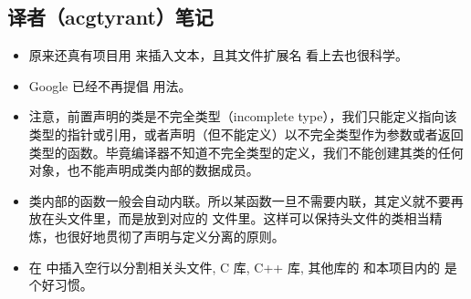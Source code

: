 \subsection{译者（acgtyrant）笔记}

\begin{itemize}
	\item  原来还真有项目用  来插入文本，且其文件扩展名  看上去也很科学。
	\item  Google 已经不再提倡  用法。
	\item  注意，前置声明的类是不完全类型（incomplete type），我们只能定义指向该类型的指针或引用，或者声明（但不能定义）以不完全类型作为参数或者返回类型的函数。毕竟编译器不知道不完全类型的定义，我们不能创建其类的任何对象，也不能声明成类内部的数据成员。
	\item  类内部的函数一般会自动内联。所以某函数一旦不需要内联，其定义就不要再放在头文件里，而是放到对应的  文件里。这样可以保持头文件的类相当精炼，也很好地贯彻了声明与定义分离的原则。
	\item  在  中插入空行以分割相关头文件, C 库, C++ 库, 其他库的  和本项目内的  是个好习惯。
\end{itemize}

